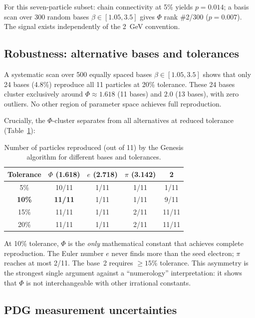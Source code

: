 \documentclass[11pt,a4paper]{article}
\begin{document}
For this seven-particle subset: chain connectivity at 5\% yields
$p = 0.014$; a basis scan over 300 random bases $\beta \in [1.05, 3.5]$
gives $\Phi$ rank \#2/300 ($p = 0.007$). The signal exists
independently of the 2~GeV convention.

\subsection{Robustness: alternative bases and tolerances}
\label{sec:robustness}

A systematic scan over 500 equally spaced bases
$\beta \in [1.05, 3.5]$ shows that only 24 bases (4.8\%) reproduce
all 11 particles at 20\% tolerance. These 24 bases cluster exclusively
around $\Phi \approx 1.618$ (11 bases) and $2.0$ (13 bases), with zero
outliers. No other region of parameter space achieves full reproduction.

Crucially, the $\Phi$-cluster separates from all alternatives at
reduced tolerance (Table~\ref{tab:tol_sensitivity}):

\begin{table}[h]
\centering
\caption{Number of particles reproduced (out of 11) by the Genesis
algorithm for different bases and tolerances.}
\label{tab:tol_sensitivity}
\begin{tabular}{@{}ccccc@{}}
\toprule
Tolerance & $\Phi$ (1.618) & $e$ (2.718) & $\pi$ (3.142) & 2 \\
\midrule
5\%  & 10/11 & 1/11 & 1/11 & 1/11 \\
\textbf{10\%} & \textbf{11/11} & 1/11 & 1/11 & 9/11 \\
15\% & 11/11 & 1/11 & 2/11 & 11/11 \\
20\% & 11/11 & 1/11 & 2/11 & 11/11 \\
\bottomrule
\end{tabular}
\end{table}

\noindent
At 10\% tolerance, $\Phi$ is the \emph{only} mathematical constant
that achieves complete reproduction. The Euler number $e$ never finds
more than the seed electron; $\pi$ reaches at most 2/11. The base~2
requires $\geq 15\%$ tolerance. This asymmetry is the strongest
single argument against a ``numerology'' interpretation: it shows that
$\Phi$ is not interchangeable with other irrational constants.

\subsection{PDG measurement uncertainties}
\label{sec:pdg_errors}
\end{document}
